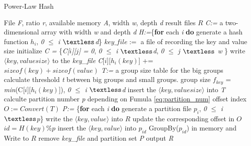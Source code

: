 \begin{algorithm}[ht]
    \caption{Power-Law Hash}
  \label{alg:group}
    \begin{algorithmic}[1]
    \Require  File \emph{F}, ratio \emph{r}, available memory \emph{A}, width \emph{w}, depth \emph{d}
    \Ensure result files $R$
    \State \emph{C:=} a two-dimensional array with width \emph{w} and depth \emph{d}
    \State \emph{H:=}\{\textbf{for} each \emph{i} \textbf{do} generate a hash function $h_i$, \emph{0 $\le$ i $\textless$d}\}    
    \State $key\_file :=$ a file of recording the key and value size
    \State initialize \emph{C = } \{\emph{C[$i$][$j$] = 0}, \emph{0 $\le$ i $\textless$d}, \emph{0 $\le$ j $\textless$ w} \}
    	\State write $\langle key,valuesize\rangle$ to the \emph{key\_file}
          \State \emph{C}[$i$][$h_{i}(key)$] += $sizeof(key) + sizeof(value)$
        \EndFor  
    \EndFor
    \State \emph{T:=} a group size table for the big groups
    \State calculate threshold \emph{t} between big groups and small groups.
    	\State group size $f_{key}$ = \emph{min}(C[$i$][$h_{i}(key)$]), \emph{0 $\le$ i $\textless$d}
    		\State insert the $\langle key,valuesize\rangle$ into \emph{T}    
    	\EndIf    	
    \EndFor
    \State calculte partition number \emph{p} depending on Fumula \ref{eq:partition_num}
    \State offset index $O:=Convert(T)$
    \State \emph{P:=} \{\textbf{for} each \emph{i} \textbf{do} generate a partition file $p_i$, \emph{0 $\le$ i $\textless$p}\}
    		\State write the $\langle key,value\rangle$ into $R$
    		\State update the corresponding offset in $O$
    	\Else 
    		\State $id = H(key) \% p$
    		\State insert the $\langle key,value\rangle$ into $p_{id}$ 
    	\EndIf
    \EndFor
		\State GroupBy($p_{id}$) in memory and Write to $R$
    \EndFor
    \State remove \emph{key\_file} and partition set \emph{P}
    \State output \emph{R}
    \end{algorithmic}
\end{algorithm}

